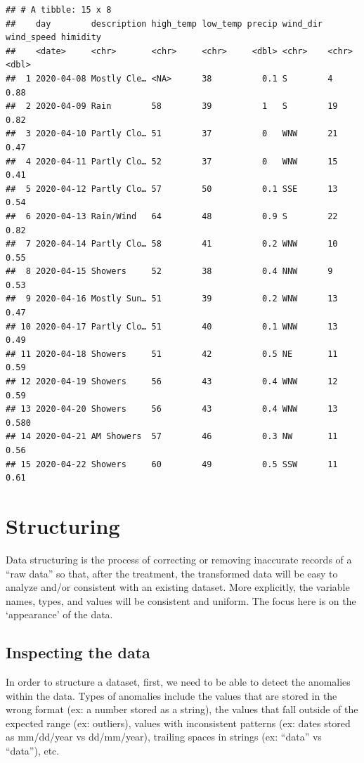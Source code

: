 \documentclass[
]{book}
\begin{document}
\begin{verbatim}
## # A tibble: 15 x 8
##    day        description high_temp low_temp precip wind_dir wind_speed himidity
##    <date>     <chr>       <chr>     <chr>     <dbl> <chr>    <chr>         <dbl>
##  1 2020-04-08 Mostly Cle… <NA>      38          0.1 S        4             0.88 
##  2 2020-04-09 Rain        58        39          1   S        19            0.82 
##  3 2020-04-10 Partly Clo… 51        37          0   WNW      21            0.47 
##  4 2020-04-11 Partly Clo… 52        37          0   WNW      15            0.41 
##  5 2020-04-12 Partly Clo… 57        50          0.1 SSE      13            0.54 
##  6 2020-04-13 Rain/Wind   64        48          0.9 S        22            0.82 
##  7 2020-04-14 Partly Clo… 58        41          0.2 WNW      10            0.55 
##  8 2020-04-15 Showers     52        38          0.4 NNW      9             0.53 
##  9 2020-04-16 Mostly Sun… 51        39          0.2 WNW      13            0.47 
## 10 2020-04-17 Partly Clo… 51        40          0.1 WNW      13            0.49 
## 11 2020-04-18 Showers     51        42          0.5 NE       11            0.59 
## 12 2020-04-19 Showers     56        43          0.4 WNW      12            0.59 
## 13 2020-04-20 Showers     56        43          0.4 WNW      13            0.580
## 14 2020-04-21 AM Showers  57        46          0.3 NW       11            0.56 
## 15 2020-04-22 Showers     60        49          0.5 SSW      11            0.61
\end{verbatim}

\hypertarget{structuring}{%
\chapter{Structuring}\label{structuring}}

Data structuring is the process of correcting or removing inaccurate records of a ``raw data'' so that, after the treatment, the transformed data will be easy to analyze and/or consistent with an existing dataset. More explicitly, the variable names, types, and values will be consistent and uniform. The focus here is on the `appearance' of the data.

\hypertarget{inspecting-the-data}{%
\section{Inspecting the data}\label{inspecting-the-data}}

In order to structure a dataset, first, we need to be able to detect the anomalies within the data. Types of anomalies include the values that are stored in the wrong format (ex: a number stored as a string), the values that fall outside of the expected range (ex: outliers), values with inconsistent patterns (ex: dates stored as mm/dd/year vs dd/mm/year), trailing spaces in strings (ex: ``data'' vs ``data''), etc.
\end{document}
